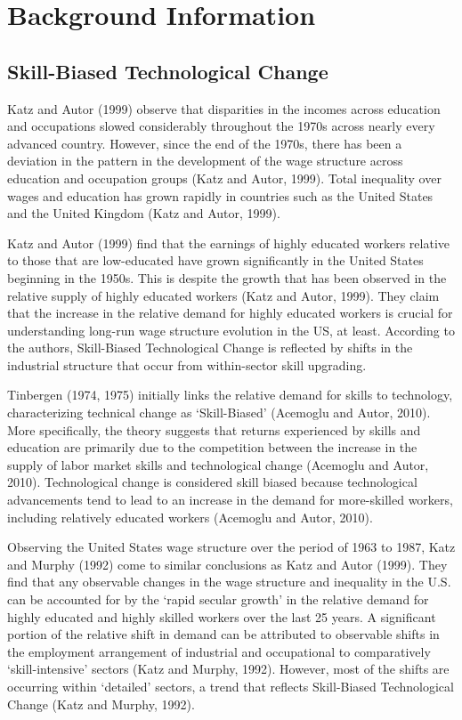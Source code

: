 \documentclass[undefended]{bumrp}
\begin{document}
\chapter{Background Information}

\section{Skill-Biased Technological Change}

Katz and Autor (1999) observe that disparities in the incomes across education and occupations slowed considerably throughout the 1970s across nearly every advanced country. However, since the end of the 1970s, there has been a deviation in the pattern in the development of the wage structure across education and occupation groups (Katz and Autor, 1999). Total inequality over wages and education has grown rapidly in countries such as the United States and the United Kingdom (Katz and Autor, 1999).

Katz and Autor (1999) find that the earnings of highly educated workers relative to those that are low-educated have grown significantly in the United States beginning in the 1950s. This is despite the growth that has been observed in the relative supply of highly educated workers (Katz and Autor, 1999). They claim that the increase in the relative demand for highly educated workers is crucial for understanding long-run wage structure evolution in the US, at least. According to the authors, Skill-Biased Technological Change is reflected by shifts in the industrial structure that occur from within-sector skill upgrading.

Tinbergen (1974, 1975) initially links the relative demand for skills to technology, characterizing technical change as ‘Skill-Biased’ (Acemoglu and Autor, 2010). More specifically, the theory suggests that returns experienced by skills and education are primarily due to the competition between the increase in the supply of labor market skills and technological change (Acemoglu and Autor, 2010). Technological change is considered skill biased because technological advancements tend to lead to an increase in the demand for more-skilled workers, including relatively educated workers (Acemoglu and Autor, 2010).

Observing the United States wage structure over the period of 1963 to 1987, Katz and Murphy (1992) come to similar conclusions as Katz and Autor (1999). They find that any observable changes in the wage structure and inequality in the U.S. can be accounted for by the ‘rapid secular growth’ in the relative demand for highly educated and highly skilled workers over the last 25 years. A significant portion of the relative shift in demand can be attributed to observable shifts in the employment arrangement of industrial and occupational to comparatively ‘skill-intensive’ sectors (Katz and Murphy, 1992). However, most of the shifts are occurring within ‘detailed’ sectors, a trend that reflects Skill-Biased Technological Change (Katz and Murphy, 1992).
\end{document}

